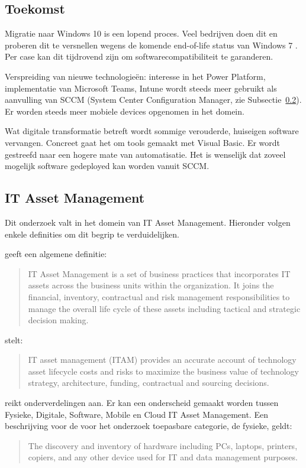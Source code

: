 \subsection{Toekomst}

Migratie naar Windows 10 is een lopend proces. Veel bedrijven doen dit en proberen dit te versnellen wegens de komende end-of-life status van Windows 7 \autocite{MicrosoftSupport2020}. Per case kan dit tijdrovend zijn om softwarecompatibiliteit te garanderen.

Verspreiding van nieuwe technologieën: interesse in het Power Platform, implementatie van Microsoft Teams, Intune wordt steeds meer gebruikt als aanvulling van SCCM (System Center Configuration Manager, zie Subsectie~\ref{subsec:itam}). Er worden steeds meer mobiele devices opgenomen in het domein.

Wat digitale transformatie betreft wordt sommige verouderde, huiseigen software vervangen. Concreet gaat het om tools gemaakt met Visual Basic.
Er wordt gestreefd naar een hogere mate van automatisatie. Het is wenselijk dat zoveel mogelijk software gedeployed kan worden vanuit SCCM.

\subsection{IT Asset Management}
\label{subsec:itam}

Dit onderzoek valt in het domein van IT Asset Management. Hieronder volgen enkele definities om dit begrip te verduidelijken.

\textcite{IAITAM} geeft een algemene definitie: 
\begin{quote}
    IT Asset Management is a set of business practices that incorporates IT assets across the business units within the organization. It joins the financial, inventory, contractual and risk management responsibilities to manage the overall life cycle of these assets including tactical and strategic decision making.
\end{quote}

\textcite{Gartner} stelt:
\begin{quote}
    IT asset management (ITAM) provides an accurate account of technology asset lifecycle costs and risks to maximize the business value of technology strategy, architecture, funding, contractual and sourcing decisions.
\end{quote}

\textcite{Ivanti2018} reikt onderverdelingen aan. Er kan een onderscheid gemaakt worden tussen Fysieke, Digitale, Software, Mobile en Cloud IT Asset Management.
Een beschrijving voor de voor het onderzoek toepasbare categorie, de fysieke, geldt:
\begin{quote}
    The discovery and inventory of hardware including PCs, laptops, printers, copiers, and any other device used for IT and data management purposes.
\end{quote}

